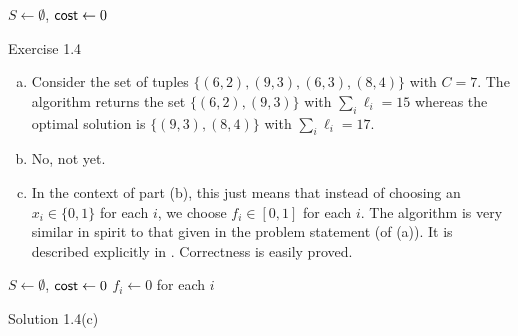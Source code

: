 \begin{algorithm}
	\DontPrintSemicolon
	\SetNoFillComment
	 
	$S\gets\emptyset$, $\mathsf{cost}\gets 0$\;
	\caption{Exercise 1.4}\label{algo: ex 1.4}
\end{algorithm}

\begin{solution*}
	\begin{enumerate}[(a)]
		\item Consider the set of tuples $\{(6,2),(9,3),(6,3),(8,4)\}$ with $C=7$. The algorithm returns the set $\{(6,2),(9,3)\}$ with $\sum_i \ell_i=15$ whereas the optimal solution is $\{(9,3),(8,4)\}$ with $\sum_i \ell_i = 17$.

		\item No, not yet.

		\item In the context of part (b), this just means that instead of choosing an $x_i\in\{0,1\}$ for each $i$, we choose $f_i\in[0,1]$ for each $i$. The algorithm is very similar in spirit to that given in the problem statement (of (a)). It is described explicitly in . Correctness is easily proved.

	\end{enumerate}
\end{solution*}


\begin{algorithm}
	\DontPrintSemicolon
	\SetNoFillComment
	\;
	$S\gets\emptyset$, $\mathsf{cost}\gets 0$\;
	$f_i\gets 0$ for each $i$\;
	\caption{Solution 1.4(c)}\label{algo: sol 1.4(c)}
\end{algorithm}

